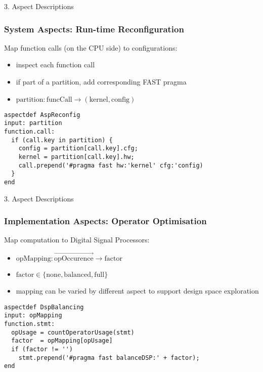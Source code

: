 \begin{frame}[fragile]{3. Aspect Descriptions}
  \frametitle{ System Aspects: Run-time Reconfiguration}
  Map function calls (on the CPU side) to configurations:
  \begin{itemize}
  \item inspect each function call
  \item if part of a partition, add corresponding FAST pragma
  \item $ \text{partition} : \text{funcCall} \rightarrow (\text{kernel}, \text{config}) $
  \end{itemize}

  \begin{lstlisting}[style=lara]
aspectdef AspReconfig
input: partition
function.call:
  if (call.key in partition) {
    config = partition[call.key].cfg;
    kernel = partition[call.key].hw;
    call.prepend('#pragma fast hw:'kernel' cfg:'config)
  }
end
  \end{lstlisting}
\end{frame}

\begin{frame}[fragile]{3. Aspect Descriptions}
  \frametitle{Implementation Aspects: Operator Optimisation}
  Map computation to Digital Signal Processors:
  \begin{itemize}
  \item $ \text{opMapping} : \overrightarrow{\text{opOccurence}} \rightarrow \text{factor}$
  \item $\text{factor} \in \{\text{none}, \text{balanced}, \text{full}\} $
  \item mapping can be varied by different aspect to support design
    space exploration
  \end{itemize}
  \begin{lstlisting}[label=lst:label, style=lara]
aspectdef DspBalancing
input: opMapping
function.stmt:
  opUsage = countOperatorUsage(stmt)
  factor  = opMapping[opUsage]
  if (factor != '')
    stmt.prepend('#pragma fast balanceDSP:' + factor);
end
  \end{lstlisting}
\end{frame}

